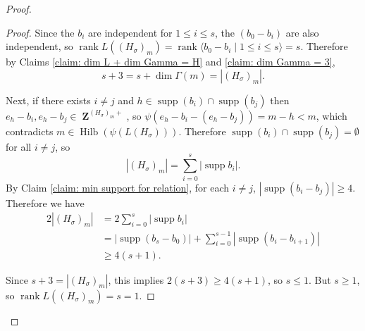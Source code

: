 \documentclass[10pt,a4paper]{amsart}
\DeclareMathOperator{\Hilb}{Hilb}
\DeclareMathOperator{\ZZ}{\mathbf{Z}}
\DeclareMathOperator{\rank}{rank}
\DeclareMathOperator{\supp}{supp}
\begin{document}
\begin{proof}
\begin{proof}
    Since the $b_i$ are independent for $1 \leq i \leq s$, the $(b_0-b_i)$ are also independent, so $\rank L((H_\sigma)_m) = \rank \langle b_0 - b_i \mid 1 \leq i \leq s \rangle = s$. Therefore by Claims \ref{claim: dim L + dim Gamma = H} and \ref{claim: dim Gamma = 3},
    \begin{equation} \label{eq: s + 3 = H}
        s+3=s + \dim \Gamma(m) = |(H_\sigma)_m|.
    \end{equation}

    Next, if there exists $i \neq j$ and $h \in \supp(b_i) \cap \supp(b_j)$ then $e_h - b_i ,e_h - b_j  \in \ZZ^{(H_\sigma)_m+}$, so $\psi(e_h - b_i -(e_h - b_j ))=m-h < m$, which contradicts $m \in \Hilb(\psi(L(H_\sigma)))$. Therefore $\supp(b_i) \cap \supp(b_j) = \emptyset$ for all $i \neq j$, so
    \begin{equation}
        |(H_\sigma)_m| = \sum^s_{i=0} |\supp b_i|.
    \end{equation}
    By Claim \ref{claim: min support for relation}, for each $i \neq j$, $|\supp(b_i - b_j)| \geq 4$. Therefore we have
    \begin{align}
        2|(H_\sigma)_m| &= 2 \sum_{i=0}^s|\supp b_i| \\
        &= |\supp(b_{s} - b_0)| + \sum_{i=0}^{s-1} | \supp (b_i - b_{i+1})|\\
        & \geq 4(s+1).
    \end{align}

    Since $s+3 = |(H_\sigma)_m|$, this implies $2(s+3) \geq 4(s+1)$, so $s \leq 1$. But $s \geq 1$, so $\rank L((H_\sigma)_m)=s=1$.
    \end{proof}


\end{proof}
\end{document}

